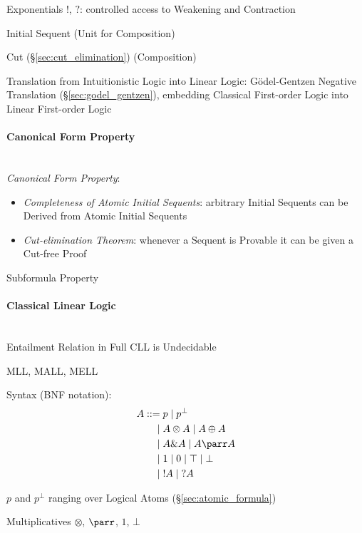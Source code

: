 Exponentials $!$, $?$: controlled access to Weakening and Contraction

Initial Sequent (Unit for Composition)

Cut (\S\ref{sec:cut_elimination}) (Composition)

Translation from Intuitionistic Logic into Linear Logic:
G\"odel-Gentzen Negative Translation (\S\ref{sec:godel_gentzen}),
embedding Classical First-order Logic into Linear First-order Logic



\paragraph{Canonical Form Property}\label{sec:canonical_form_property}
\hfill \\

\emph{Canonical Form Property}:
\begin{itemize}
  \item \emph{Completeness of Atomic Initial Sequents}: arbitrary
    Initial Sequents can be Derived from Atomic Initial Sequents
  \item \emph{Cut-elimination Theorem}: whenever a Sequent is Provable
    it can be given a Cut-free Proof
\end{itemize}

Subformula Property



\paragraph{Classical Linear Logic}\label{sec:classical_linear_logic}
\hfill \\

Entailment Relation in Full CLL is Undecidable

MLL, MALL, MELL

Syntax (BNF notation):
\[
\begin{split}
  A ::=& \; p \; | \; p^\bot\\
      |& \; A \otimes A \; | \; A \oplus A\\
      |& \; A \& A \; | \; A \parr A\\
      |& \; 1 \; | \; 0 \; | \; \top \; | \; \bot\\
      |& \; !A \; | \; ?A
\end{split}
\]

$p$ and $p^\bot$ ranging over Logical Atoms
(\S\ref{sec:atomic_formula})

Multiplicatives $\otimes$, $\parr$, $1$, $\bot$

